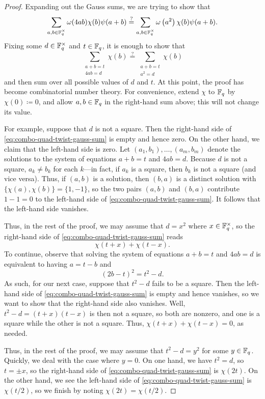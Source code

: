 \begin{proof}
    Expanding out the Gauss sums, we are trying to show that
    \[\sum_{a,b\in\mathbb F_q^\times}\omega(4ab)\chi(b)\psi(a+b)\stackrel?=\sum_{a,b\in\mathbb F_q^\times}\omega\left(a^2\right)\chi(b)\psi(a+b).\]
    Fixing some $d\in\mathbb F_q^\times$ and $t\in\mathbb F_q$, it is enough to show that
    \begin{equation}
        \sum_{\substack{a+b=t\\4ab=d}}\chi(b) \stackrel?= \sum_{\substack{a+b=t\\a^2=d}}\chi(b) \label{eq:combo-quad-twist-gauss-sum}
    \end{equation}
    and then sum over all possible values of $d$ and $t$. At this point, the proof has become combinatorial number theory. For convenience, extend $\chi$ to $\mathbb F_q$ by $\chi(0)\coloneqq0$, and allow $a,b\in\mathbb F_q$ in the right-hand sum above; this will not change its value.

    For example, suppose that $d$ is not a square. Then the right-hand side of \eqref{eq:combo-quad-twist-gauss-sum} is empty and hence zero. On the other hand, we claim that the left-hand side is zero. Let $(a_1,b_1),\ldots,(a_m,b_m)$ denote the solutions to the system of equations $a+b=t$ and $4ab=d$. Because $d$ is not a square, $a_k\ne b_k$ for each $k$---in fact, if $a_k$ is a square, then $b_k$ is not a square (and vice versa). Thus, if $(a,b)$ is a solution, then $(b,a)$ is a distinct solution with $\{\chi(a),\chi(b)\}=\{1,-1\}$, so the two pairs $(a,b)$ and $(b,a)$ contribute $1-1=0$ to the left-hand side of \eqref{eq:combo-quad-twist-gauss-sum}. It follows that the left-hand side vanishes.

    Thus, in the rest of the proof, we may assume that $d=x^2$ where $x\in\mathbb F_q^\times$, so the right-hand side of \eqref{eq:combo-quad-twist-gauss-sum} reads
    \[\chi(t+x)+\chi(t-x).\]
    To continue, observe that solving the system of equations $a+b=t$ and $4ab=d$ is equivalent to having $a=t-b$ and
    \[(2b-t)^2=t^2-d.\]
    As such, for our next case, suppose that $t^2-d$ fails to be a square. Then the left-hand side of \eqref{eq:combo-quad-twist-gauss-sum} is empty and hence vanishes, so we want to show that the right-hand side also vanishes. Well, $t^2-d=(t+x)(t-x)$ is then not a square, so both are nonzero, and one is a square while the other is not a square. Thus, $\chi(t+x)+\chi(t-x)=0$, as needed.

    Thus, in the rest of the proof, we may assume that $t^2-d=y^2$ for some $y\in\mathbb F_q$. Quickly, we deal with the case where $y=0$. On one hand, we have $t^2=d$, so $t=\pm x$, so the right-hand side of \eqref{eq:combo-quad-twist-gauss-sum} is $\chi(2t)$. On the other hand, we see the left-hand side of \eqref{eq:combo-quad-twist-gauss-sum} is $\chi(t/2)$, so we finish by noting $\chi(2t)=\chi(t/2)$.


\end{proof}
